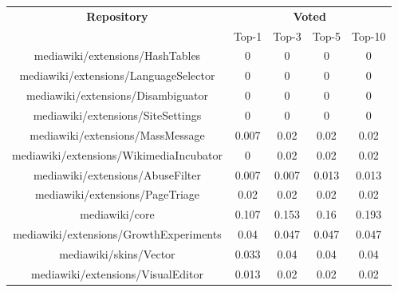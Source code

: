 \begin{center}
\hspace{0.25cm}
\begin{tabular}{@{}c c c c c@{}} 
 \hline
    \textbf{Repository} &
    \multicolumn{4}{c}{\textbf{Voted}} \\
      & {Top-1} & {Top-3} & {Top-5} & {Top-10} \\
      \hline
mediawiki/extensions/HashTables & 0 & 0 & 0 & 0 \\
mediawiki/extensions/LanguageSelector & 0 & 0 & 0 & 0 \\
mediawiki/extensions/Disambiguator & 0 & 0 & 0 & 0 \\
mediawiki/extensions/SiteSettings & 0 & 0 & 0 & 0 \\
mediawiki/extensions/MassMessage & 0.007 & 0.02 & 0.02 & 0.02 \\
mediawiki/extensions/WikimediaIncubator & 0 & 0.02 & 0.02 & 0.02 \\
mediawiki/extensions/AbuseFilter & 0.007 & 0.007 & 0.013 & 0.013 \\
mediawiki/extensions/PageTriage & 0.02 & 0.02 & 0.02 & 0.02 \\
mediawiki/core & 0.107 & 0.153 & 0.16 & 0.193 \\
mediawiki/extensions/GrowthExperiments & 0.04 & 0.047 & 0.047 & 0.047 \\
mediawiki/skins/Vector & 0.033 & 0.04 & 0.04 & 0.04 \\
mediawiki/extensions/VisualEditor & 0.013 & 0.02 & 0.02 & 0.02 \\
\hline
\end{tabular}
\end{center}

